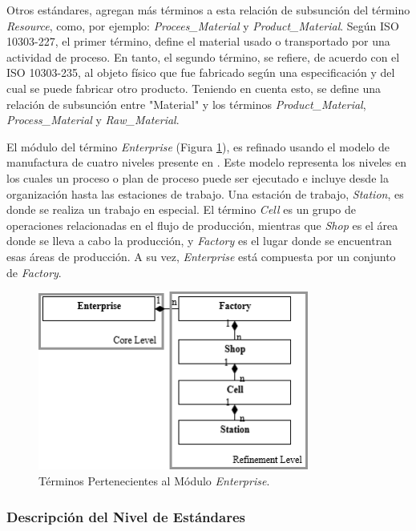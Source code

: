 \documentclass[journal]{IEEEtran}
\begin{document}
Otros est\'andares, agregan m\'as t\'erminos a esta relaci\'on de subsunci\'on del t\'ermino \emph{Resource}, como, por ejemplo: \emph{Procees\_Material} y \emph{Product\_Material}. Seg\'un ISO 10303-227, el primer t\'ermino, define el material usado o transportado por una actividad de proceso. En tanto, el segundo t\'ermino, se refiere, de acuerdo con el ISO 10303-235, al objeto f\'isico que fue fabricado seg\'un una especificaci\'on y del cual se puede fabricar otro producto. Teniendo en cuenta esto, se define una relaci\'on de subsunci\'on entre "Material" y los t\'erminos \emph{Product\_Material}, \emph{Process\_Material} y \emph{Raw\_Material}.

El m\'odulo del t\'ermino \emph{Enterprise} (Figura \ref{fig7}), es refinado usando el modelo de manufactura de cuatro niveles presente en \cite{Zhao1999}. Este modelo representa los niveles en los cuales un proceso o plan de proceso puede ser ejecutado e incluye desde la organizaci\'on hasta las estaciones de trabajo. Una estaci\'on de trabajo, \emph{Station}, es donde se realiza un trabajo en especial. El t\'ermino \emph{Cell} es un grupo de operaciones relacionadas en el flujo de producci\'on, mientras que \emph{Shop} es el \'area donde se lleva a cabo la producci\'on, y \emph{Factory} es el lugar donde se encuentran esas \'areas de producci\'on. A su vez, \emph{Enterprise} est\'a compuesta por un conjunto de \emph{Factory}.

\begin{figure}[!t]
\centering
\includegraphics[width=3.5in]{figures/Completo-Enterprise.png}
\caption{T\'erminos Pertenecientes al M\'odulo \emph{Enterprise}.}
\label{fig7}
\end{figure}

\subsubsection{Descripci\'on del Nivel de Est\'andares}
\end{document}

